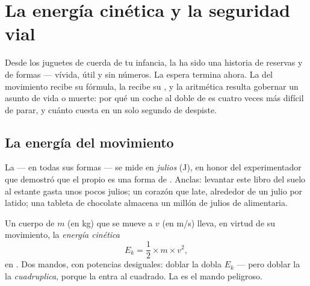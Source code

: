\chapter{La energía cinética y la seguridad vial}\label{ch:g9:kinetic-energy-safety}

Desde los juguetes de cuerda de tu infancia, la  ha sido una
historia de reservas y de formas --- vívida, útil y sin números. La
espera termina ahora. La  del movimiento recibe su fórmula,
la  recibe su , y la aritmética resulta
gobernar un asunto de vida o muerte: por qué un coche al doble de
 es cuatro veces más difícil de parar, y cuánto cuesta en
 un solo segundo de despiste.

\section{La energía del movimiento}

\begin{definition}[El julio]\label{def:g9:kinetic-energy-safety:joule}
La  --- en todas sus formas --- se mide en
\emph{julios} (\unit{J}), en honor del experimentador que
demostró que el propio  es una forma de .
Anclas: levantar este libro del suelo al estante gasta unos pocos
julios; un corazón que late, alrededor de un julio por latido; una
tableta de chocolate almacena un millón de julios de 
alimentaria.
\end{definition}

\begin{proposition}\label{prop:g9:kinetic-energy-safety:formula}
Un cuerpo de  $m$ (en \unit{kg}) que se mueve a
 $v$ (en \unit{m/s}) lleva, en virtud de su movimiento, la
\emph{energía cinética}
\[
E_k = \frac{1}{2} \times m \times v^2 ,
\]
en . Dos mandos, con potencias desiguales: doblar la
 dobla $E_k$ --- pero doblar la \emph{} la
\emph{cuadruplica}, porque la  entra al cuadrado. La
 es el mando peligroso.
\end{proposition}

